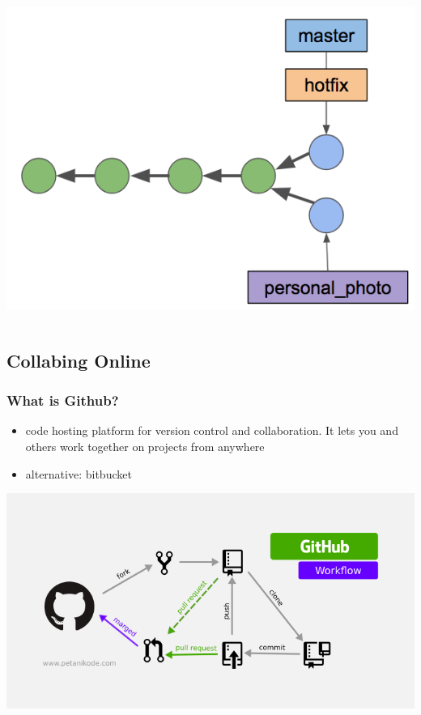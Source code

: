\documentclass[12pt]{beamer}
\begin{document}
\begin{frame}
\begin{columns}
\begin{column}{0.33\linewidth}
		\includegraphics[width=\linewidth]{branch_1}
	\end{column}
\end{columns}
\end{frame}

\subsection{Collabing Online}
\begin{frame}
\frametitle{What is Github?}
\begin{itemize}
	\item code hosting platform for version control and collaboration. It lets you and others work together on projects from anywhere
	\item alternative: bitbucket
\end{itemize}
\begin{center}
	\includegraphics[width=0.75\linewidth]{github-workflow}
\end{center}
\end{frame}
\end{document}

